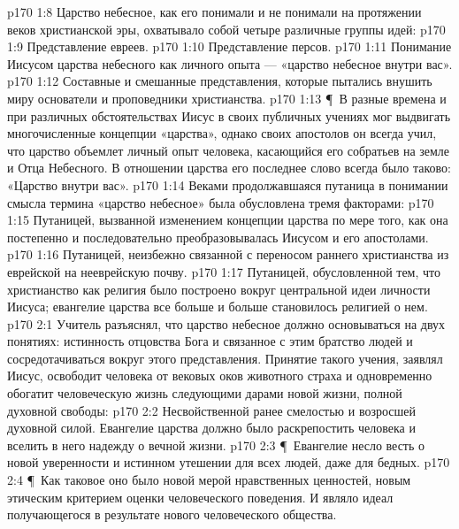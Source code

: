 \vs p170 1:8 Царство небесное, как его понимали и не понимали на протяжении веков христианской эры, охватывало собой четыре различные группы идей:
\vs p170 1:9 \bibnobreakspace Представление евреев.
\vs p170 1:10 \bibnobreakspace Представление персов.
\vs p170 1:11 \bibnobreakspace Понимание Иисусом царства небесного как личного опыта --- «царство небесное внутри вас».
\vs p170 1:12 \bibnobreakspace Составные и смешанные представления, которые пытались внушить миру основатели и проповедники христианства.
\vs p170 1:13 \P\ В разные времена и при различных обстоятельствах Иисус в своих публичных учениях мог выдвигать многочисленные концепции «царства», однако своих апостолов он всегда учил, что царство объемлет личный опыт человека, касающийся его собратьев на земле и Отца Небесного. В отношении царства его последнее слово всегда было таково: «Царство внутри вас».
\vs p170 1:14 Веками продолжавшаяся путаница в понимании смысла термина «царство небесное» была обусловлена тремя факторами:
\vs p170 1:15 \bibnobreakspace Путаницей, вызванной изменением концепции царства по мере того, как она постепенно и последовательно преобразовывалась Иисусом и его апостолами.
\vs p170 1:16 \bibnobreakspace Путаницей, неизбежно связанной с переносом раннего христианства из еврейской на нееврейскую почву.
\vs p170 1:17 \bibnobreakspace Путаницей, обусловленной тем, что христианство как религия было построено вокруг центральной идеи личности Иисуса; евангелие царства все больше и больше становилось религией о нем.
\vs p170 2:1 Учитель разъяснял, что царство небесное должно основываться на двух понятиях: истинность отцовства Бога и связанное с этим братство людей и сосредотачиваться вокруг этого представления. Принятие такого учения, заявлял Иисус, освободит человека от вековых оков животного страха и одновременно обогатит человеческую жизнь следующими дарами новой жизни, полной духовной свободы:
\vs p170 2:2 \bibnobreakspace Несвойственной ранее смелостью и возросшей духовной силой. Евангелие царства должно было раскрепостить человека и вселить в него надежду о вечной жизни.
\vs p170 2:3 \P\ \bibnobreakspace Евангелие несло весть о новой уверенности и истинном утешении для всех людей, даже для бедных.
\vs p170 2:4 \P\ \bibnobreakspace Как таковое оно было новой мерой нравственных ценностей, новым этическим критерием оценки человеческого поведения. И являло идеал получающегося в результате нового человеческого общества.
